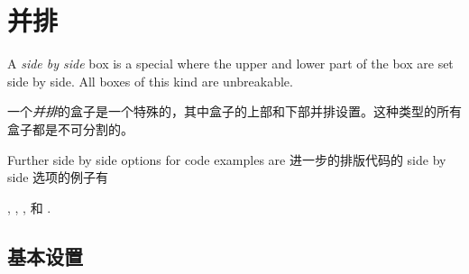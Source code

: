 



\setcounter{section}{5}
\setcounter{subsection}{2}

\section{并排}\label{sec:sidebyside}%
%
A \emph{side by side} box is a special  where
the upper and lower part of the box are set side by side.
All boxes of this kind are unbreakable.


一个\emph{并排}的盒子是一个特殊的，其中盒子的上部和下部并排设置。这种类型的所有盒子都是不可分割的。


\begin{marker}
\begin{stripedbox}
Further side by side options for code examples are
\tcblower
进一步的排版代码的 side by side 选项的例子有
\end{stripedbox}

,
,
, 和
.
\end{marker}

\subsection{基本设置}\label{subsec:sidebyside_basic}

